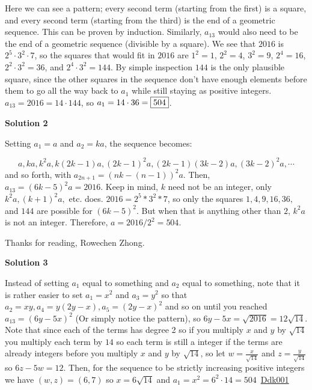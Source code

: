 \begin{enumerate}
 Here we can see a pattern; every second term (starting from the first) is a square, and every second term (starting from the third) is the end of a geometric sequence. This can be proven by induction. Similarly, $a_{13}$ would also need to be the end of a geometric sequence (divisible by a square). We see that $2016$ is $2^5 \cdot 3^2 \cdot 7$, so the squares that would fit in $2016$ are $1^2=1$, $2^2=4$, $3^2=9$, $2^4=16$, $2^2 \cdot 3^2 = 36$, and $2^4 \cdot 3^2 = 144$. By simple inspection $144$ is the only plausible square, since the other squares in the sequence don't have enough elements before them to go all the way back to $a_1$ while still staying as positive integers. $a_{13}=2016=14\cdot 144$, so $a_1=14\cdot 36=\fbox{504}$.

 



\textbf{Solution 2}

Setting $a_1 = a$ and $a_2 = ka$, the sequence becomes:

 
 \[a, ka, k^2a, k(2k-1)a, (2k-1)^2a, (2k-1)(3k-2)a, (3k-2)^2a, \cdots\]and so forth, with $a_{2n+1} = (nk-(n-1))^2a$. Then, $a_{13} = (6k-5)^2a = 2016$. Keep in mind, $k$ need not be an integer, only $k^2a, (k+1)^2a,$ etc. does. $2016 = 2^5*3^2*7$, so only the squares $1, 4, 9, 16, 36,$ and $144$ are possible for $(6k-5)^2$. But when that is anything other than $2$, $k^2a$ is not an integer. Therefore, $a = 2016/2^2 = 504$.

 Thanks for reading, Rowechen Zhong.

 



\textbf{Solution 3}

Instead of setting $a_1$ equal to something and $a_2$ equal to something, note that it is rather easier to set $a_1=x^2$ and $a_3=y^2$ so that $a_2=xy,a_4=y(2y-x),a_5=(2y-x)^2$ and so on until you reached $a_{13}=(6y-5x)^2$ (Or simply notice the pattern), so $6y-5x=\sqrt{2016}=12\sqrt{14}$. Note that since each of the terms has degree 2 so if you multiply $x$ and $y$ by $\sqrt{14}$ you multiply each term by $14$ so each term is still a integer if the terms are already integers before you multiply $x$ and $y$ by $\sqrt{14}$, so let $w=\frac{x}{\sqrt{14}}$ and $z=\frac{y}{\sqrt{14}}$ so $6z-5w=12$. Then, for the sequence to be strictly increasing positive integers we have $(w,z)=(6,7)$ so $x=6\sqrt{14}$ and $a_1=x^2=6^2 \cdot 14=\boxed{504}$~\href{https://artofproblemsolving.com/wiki/index.php?title=Ddk001}{Ddk001}

 




\end{enumerate}
